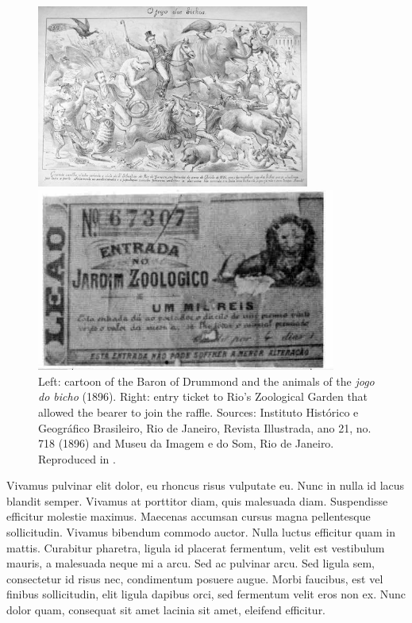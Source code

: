 \begin{figure}[!htbp]
 \centering
 \begin{minipage}[b]{0.45\textwidth}
  \includegraphics[width=\textwidth, height=6cm]{images/bicho01.jpg}
 \end{minipage}
 \hfill
 \begin{minipage}[b]{0.45\textwidth}
  \includegraphics[width=\textwidth, height=6cm]{images/bicho02.jpg}
 \end{minipage}
 \caption{Left: cartoon of the Baron of Drummond and the animals of the \emph{jogo do bicho} (1896). Right: entry ticket to Rio's Zoological Garden that allowed the bearer to join the raffle. Sources: Instituto Histórico e Geográfico Brasileiro, Rio de Janeiro, Revista Illustrada, ano 21, no. 718 (1896) and Museu da Imagem e do Som, Rio de Janeiro. Reproduced in \citet[35--36]{chazkel2011laws}.}
 \label{fig:barao}
\end{figure}

Vivamus pulvinar elit dolor, eu rhoncus risus vulputate eu. Nunc in nulla id lacus blandit semper. Vivamus at porttitor diam, quis malesuada diam. Suspendisse efficitur molestie maximus. Maecenas accumsan cursus magna pellentesque sollicitudin. Vivamus bibendum commodo auctor. Nulla luctus efficitur quam in mattis. Curabitur pharetra, ligula id placerat fermentum, velit est vestibulum mauris, a malesuada neque mi a arcu. Sed ac pulvinar arcu. Sed ligula sem, consectetur id risus nec, condimentum posuere augue. Morbi faucibus, est vel finibus sollicitudin, elit ligula dapibus orci, sed fermentum velit eros non ex. Nunc dolor quam, consequat sit amet lacinia sit amet, eleifend efficitur.

